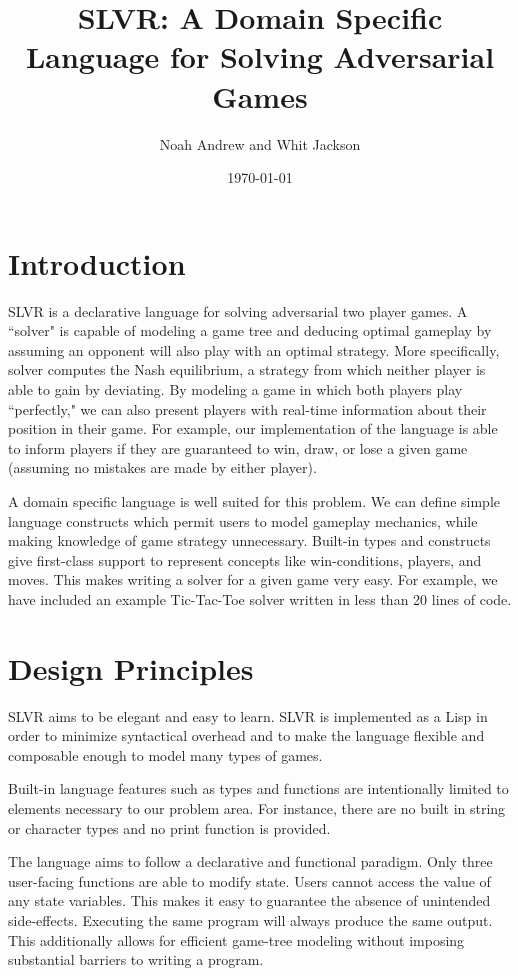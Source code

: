 \documentclass{article}
\title{SLVR: A Domain Specific Language for Solving Adversarial Games}
\author{Noah Andrew and Whit Jackson}
\date{\today}
\begin{document}
\maketitle

\section{Introduction}

SLVR is a declarative language for solving adversarial two player games. A ``solver" is capable of modeling a game tree and deducing optimal gameplay by assuming an opponent will also play with an optimal strategy. More specifically, solver computes the Nash equilibrium, a strategy from which neither player is able to gain by deviating. By modeling a game in which both players play ``perfectly," we can also present players with real-time information about their position in their game. For example, our implementation of the language is able to inform players if they are guaranteed to win, draw, or lose a given game (assuming no mistakes are made by either player).

A domain specific language is well suited for this problem. We can define simple language constructs which permit users to model gameplay mechanics, while making knowledge of game strategy unnecessary. Built-in types and constructs give first-class support to represent concepts like win-conditions, players, and moves. This makes writing a solver for a given game very easy. For example, we have included an example Tic-Tac-Toe solver written in less than 20 lines of code.


\section{Design Principles}

SLVR aims to be elegant and easy to learn. SLVR is implemented as a Lisp in order to minimize syntactical overhead and to make the language flexible and composable enough to model many types of games.

Built-in language features such as types and functions are intentionally limited to elements necessary to our problem area. For instance, there are no built in string or character types and no print function is provided.

The language aims to follow a declarative and functional paradigm. Only three user-facing functions are able to modify state. Users cannot access the value of any state variables. This makes it easy to guarantee the absence of unintended side-effects. Executing the same program will always produce the same output. This additionally allows for efficient game-tree modeling without imposing substantial barriers to writing a program.
\end{document}
